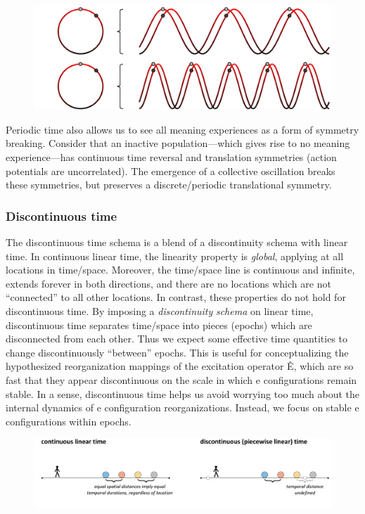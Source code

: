   
\begin{figure}
\includegraphics[width=\textwidth]{figures/Tilsen-img48.png}
\caption{\missingcaption}
\label{fig:}
\end{figure}
 

  Periodic time also allows us to see all meaning experiences as a form of symmetry breaking. Consider that an inactive population—which gives rise to no meaning experience—has continuous time reversal and translation symmetries (action potentials are uncorrelated). The emergence of a collective oscillation breaks these symmetries, but preserves a discrete/periodic translational symmetry.

\subsubsection{Discontinuous time}

The discontinuous time schema is a blend of a discontinuity schema with linear time. In continuous linear time, the linearity property is \textit{global}, applying at all locations in time/space. Moreover, the time/space line is continuous and infinite, extends forever in both directions, and there are no locations which are not “connected” to all other locations. In contrast, these properties do not hold for discontinuous time. By imposing a \textit{discontinuity} \textit{schema} on linear time, discontinuous time separates time/space into pieces (epochs) which are disconnected from each other. Thus we expect some effective time quantities to change discontinuously “between” epochs. This is useful for conceptualizing the hypothesized reorganization mappings of the excitation operator Ê, which are so fast that they appear discontinuous on the scale in which e configurations remain stable. In a sense, discontinuous time helps us avoid worrying too much about the internal dynamics of e configuration reorganizations. Instead, we focus on stable e configurations within epochs.

  
\begin{figure}
\includegraphics[width=\textwidth]{figures/Tilsen-img49.png}
\caption{\missingcaption}
\label{fig:}
\end{figure}
 

